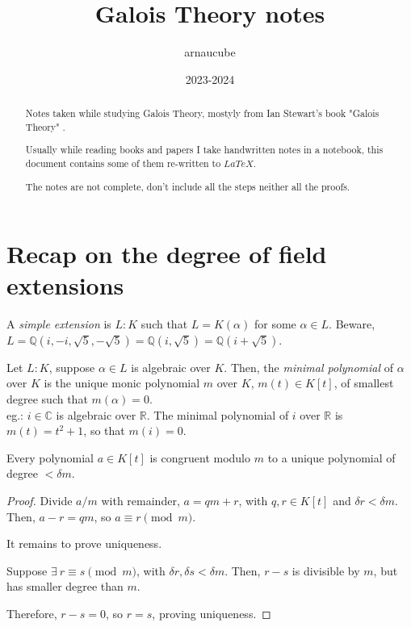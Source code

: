 \documentclass{article}
\title{Galois Theory notes}
\author{arnaucube}
\date{2023-2024}
\theoremstyle{definition}
\newenvironment{defn}[1]
{\renewcommand\theinnerdefn{#1}\innerdefn}
{\endinnerdefn}
\newenvironment{lemma}[1]
{\renewcommand\theinnerlemma{#1}\innerlemma}
{\endinnerlemma}
\newenvironment{eg}[1]
{\renewcommand\theinnereg{#1}\innereg}
{\endinnereg}
\begin{document}
\maketitle

\begin{abstract}
	Notes taken while studying Galois Theory, mostyly from Ian Stewart's book "Galois Theory" \cite{ianstewart}.

	Usually while reading books and papers I take handwritten notes in a notebook, this document contains some of them re-written to $LaTeX$.

	The notes are not complete, don't include all the steps neither all the proofs.
\end{abstract}

\tableofcontents

\section{Recap on the degree of field extensions}

\begin{defn}{4.10}
  A \emph{simple extension} is $L:K$ such that $L=K(\alpha)$ for some $\alpha \in L$.
\end{defn}
\begin{eg}{4.11}
  Beware, $L=\mathbb{Q}(i, -i, \sqrt{5}, -\sqrt{5}) = \mathbb{Q}(i, \sqrt{5}) = \mathbb{Q}(i+\sqrt{5})$.
\end{eg}

\begin{defn}{5.5}
  Let $L:K$, suppose $\alpha \in L$ is algebraic over $K$. Then, the \emph{minimal polynomial} of $\alpha$ over $K$ is the unique monic polynomial $m$ over $K$, $m(t) \in K[t]$, of smallest degree such that $m(\alpha)=0$.
  \\
  eg.: $i \in \mathbb{C}$ is algebraic over $\mathbb{R}$. The minimal polynomial of $i$ over $\mathbb{R}$ is $m(t)=t^2 +1$, so that $m(i)=0$.
\end{defn}

\begin{lemma}{5.9}
  Every polynomial $a \in K[t]$ is congruent modulo $m$ to a unique polynomial of degree $< \delta m$.
\end{lemma}
\begin{proof}
  Divide $a / m$ with remainder, $a= qm +r$, with $q,r \in K[t]$ and $\delta r < \delta m$.
  Then, $a-r=qm$, so $a \equiv r \pmod{m}$.

  It remains to prove uniqueness.

  Suppose $\exists~ r \equiv s \pmod{m}$, with $\delta r, \delta s < \delta m$.
  Then, $r-s$ is divisible by $m$, but has smaller degree than $m$.

  Therefore, $r-s=0$, so $r=s$, proving uniqueness.
\end{proof}
\end{document}
